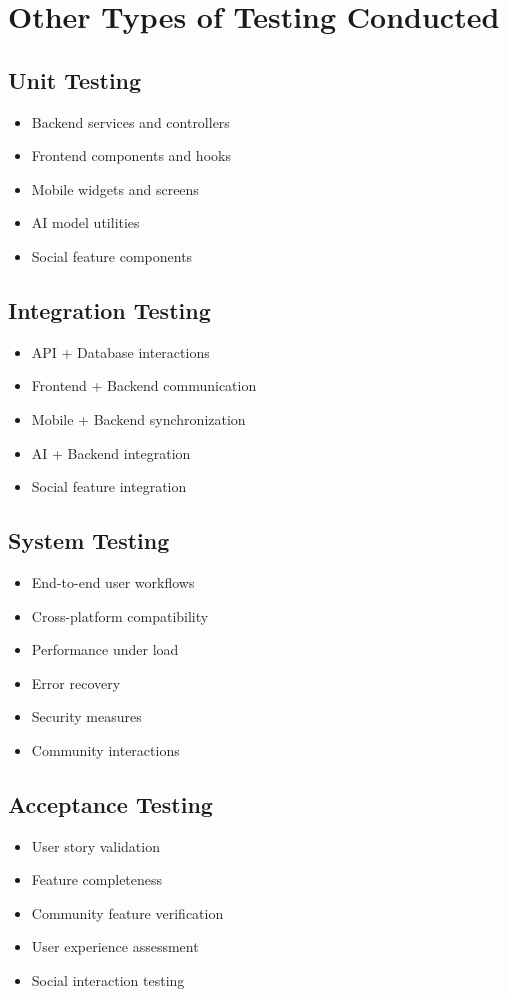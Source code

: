 \section{Other Types of Testing Conducted}

\subsection{Unit Testing}
\begin{itemize}
    \item Backend services and controllers
    \item Frontend components and hooks
    \item Mobile widgets and screens
    \item AI model utilities
    \item Social feature components
\end{itemize}

\subsection{Integration Testing}
\begin{itemize}
    \item API + Database interactions
    \item Frontend + Backend communication
    \item Mobile + Backend synchronization
    \item AI + Backend integration
    \item Social feature integration
\end{itemize}

\subsection{System Testing}
\begin{itemize}
    \item End-to-end user workflows
    \item Cross-platform compatibility
    \item Performance under load
    \item Error recovery
    \item Security measures
    \item Community interactions
\end{itemize}

\subsection{Acceptance Testing}
\begin{itemize}
    \item User story validation
    \item Feature completeness
    \item Community feature verification
    \item User experience assessment
    \item Social interaction testing
\end{itemize}

